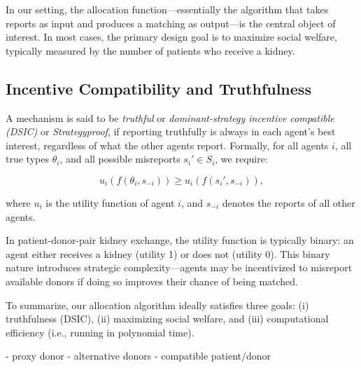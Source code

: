 In our setting, the allocation function—essentially the algorithm that takes reports as input and produces a matching as output—is the central object of interest. In most cases, the primary design goal is to maximize social welfare, typically measured by the number of patients who receive a kidney.

\subsection*{Incentive Compatibility and Truthfulness}

A mechanism is said to be \textit{truthful}  or \textit{dominant-strategy incentive compatible (DSIC)} or \textit{Strategyproof}, if reporting truthfully is always in each agent's best interest, regardless of what the other agents report. Formally, for all agents $i$, all true types $\theta_i$, and all possible misreports $s_i' \in S_i$, we require:

\[
u_i(f(\theta_i, s_{-i})) \geq u_i(f(s_i', s_{-i})),
\]

where $u_i$ is the utility function of agent $i$, and $s_{-i}$ denotes the reports of all other agents.

In patient-donor-pair kidney exchange, the utility function is typically binary: an agent either receives a kidney (utility 1) or does not (utility 0). This binary nature introduces strategic complexity—agents may be incentivized to misreport available donors if doing so improves their chance of being matched.

To summarize, our allocation algorithm ideally satisfies three goals: (i) truthfulness (DSIC), (ii) maximizing social welfare, and (iii) computational efficiency (i.e., running in polynomial time).


- proxy donor
- alternative donors
- compatible patient/donor

